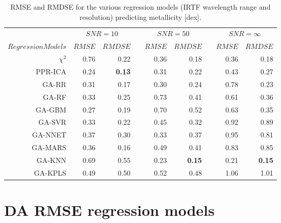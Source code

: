 \begin{table*}\centering
\begin{tabular}{@{}rrrcrrcrr@{}}\hline
& \multicolumn{2}{c}{$SNR = 10$} & \phantom{ab}& \multicolumn{2}{c}{$SNR = 50$} &
\phantom{ab} & \multicolumn{2}{c}{$SNR = \infty$}\\
\cmidrule{2-3} \cmidrule{5-6} \cmidrule{8-9}
$Regression Models$ & $RMSE$ & $RMDSE$ && $RMSE$ & $RMDSE$     && $RMSE$       & $RMDSE$ \\ \midrule
$\chi^2$    & 0.76 & 0.22      && 0.36 & 0.18     && 0.36 & 0.18 \\
PPR-ICA   & 0.24 & \bf{0.13} && 0.31 & 0.22     && 0.43 & 0.27 \\
GA-RR     & 0.31 & 0.17      && 0.30 & 0.24     && 0.78 & 0.23 \\
GA-RF     & 0.33 & 0.25      && 0.73 & 0.41     && 0.61 & 0.36 \\
GA-GBM    & 0.27 & 0.19      && 0.70 & 0.52     && 0.63 & 0.35 \\
GA-SVR    & 0.33 & 0.22      && 0.45 & 0.32     && 0.92 & 0.89 \\
GA-NNET   & 0.37 & 0.30      && 0.33 & 0.37     && 0.95 & 0.81 \\
GA-MARS   & 0.36 & 0.16      && 0.49 & 0.41     && 0.83 & 0.85 \\
GA-KNN    & 0.69 & 0.55      && 0.23 & \bf{0.15}&& 0.21 & \bf{0.15} \\ 
GA-KPLS   & 0.49 & 0.50      && 0.52 & 0.48     && 1.06 & 1.01 \\


\hline
\end{tabular}
\caption {RMSE and RMDSE for the various regression models (IRTF
  wavelength range and resolution) predicting metallicity [dex].}
\label{tab:irtf-met-rmse} 
\end{table*}


\section{DA RMSE regression models}
\label{sec:ipac-rmse}

